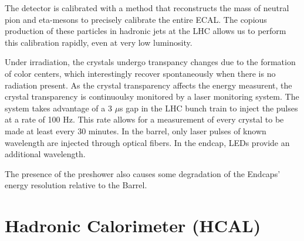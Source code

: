 The detector is calibrated with a method that reconstructs the mass of neutral
pion and eta-mesons to precisely calibrate the entire ECAL. The copious
production of these particles in hadronic jets at the LHC allows us to
perform this calibration rapidly, even at very low luminosity.

Under irradiation, the crystals undergo transpancy changes 
due to the formation of color centers, which interestingly recover spontaneously when there
is no radiation present. As the crystal transparency affects the energy measurent,
the crystal transparency is continuoulsy monitored by a laser monitoring system. 
The system takes advantage of a 3 $\mu$s gap in the LHC bunch train to inject the
pulses at a rate of 100 Hz. This rate allows for a measurement of every crystal
to be made at least every 30 minutes. In the barrel, only laser
 pulses of known wavelength are injected through optical fibers. In the endcap, LEDs provide
an additional wavelength. 

The presence of the preshower also causes some degradation of the
Endcaps' energy resolution relative to the Barrel. 



\section{Hadronic Calorimeter (HCAL)}

